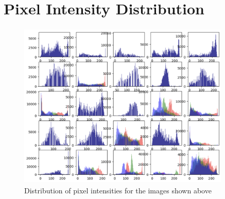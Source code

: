 \section{Pixel Intensity Distribution}

\begin{figure}[h!]
    \centering
    \includegraphics[width=0.9\textwidth, height=8cm]{resources/histo25.png}
    \caption{Distribution of pixel intensities for the images shown above}
  \end{figure}